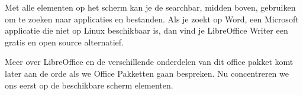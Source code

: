 Met alle elementen op het scherm kan je de searchbar, midden boven, gebruiken om te zoeken naar applicaties en bestanden. Als je zoekt op
Word, een Microsoft applicatie die niet op Linux beschikbaar is, dan vind je LibreOffice Writer een gratis en open
source alternatief.

Meer over LibreOffice en de verschillende onderdelen van dit office pakket komt later aan de
orde als we Office Pakketten gaan bespreken. Nu concentreren we ons eerst op de beschikbare scherm elementen.

